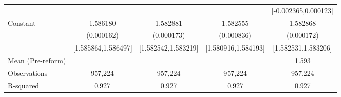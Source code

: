 {\begin{tabular}{l*{4}{c}}
                    &                     &                     &                     &[-0.002365,0.000123]         \\
Constant            &    1.586180\sym{***}&    1.582881\sym{***}&    1.582555\sym{***}&    1.582868\sym{***}\\
                    &  (0.000162)         &  (0.000173)         &  (0.000836)         &  (0.000172)         \\
                    &[1.585864,1.586497]         &[1.582542,1.583219]         &[1.580916,1.584193]         &[1.582531,1.583206]         \\
\midrule
Mean (Pre-reform)   &                     &                     &                     &       1.593         \\
Observations        &     957,224         &     957,224         &     957,224         &     957,224         \\
R-squared           &       0.927         &       0.927         &       0.927         &       0.927         \\
\bottomrule
\end{tabular}
}
